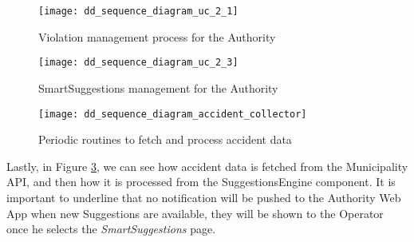 \begin{figure}[ht]
    \centering
    \texttt{[image: dd\_sequence\_diagram\_uc\_2\_1]}
    \caption{Violation management process for the Authority}
    \label{fig:dd_sequence_diagram_uc_2_1}
\end{figure}

\begin{figure}[ht]
    \centering
    \texttt{[image: dd\_sequence\_diagram\_uc\_2\_3]}
    \caption{SmartSuggestions management for the Authority}
    \label{fig:dd_sequence_diagram_uc_2_3}
\end{figure}

\clearpage

\begin{figure}[ht]
    \centering
    \texttt{[image: dd\_sequence\_diagram\_accident\_collector]}
    \caption{Periodic routines to fetch and process accident data}
    \label{fig:dd_sequence_diagram_accident_collector}
\end{figure}

Lastly, in Figure \ref{fig:dd_sequence_diagram_accident_collector}, we can see
how accident data is fetched from the Municipality API, and then how it is
processed from the SuggestionsEngine component. It is important to underline
that no notification will be pushed to the Authority Web App when new
Suggestions are available, they will be shown to the Operator once he selects
the \emph{SmartSuggestions} page.


